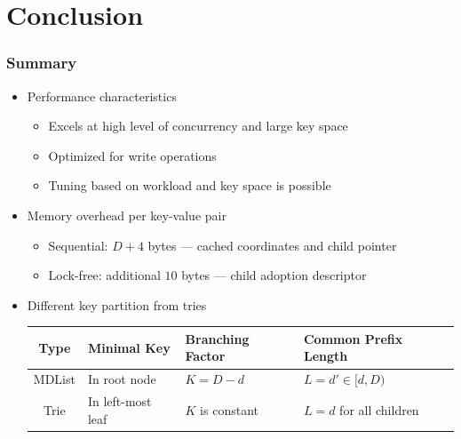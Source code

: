 \documentclass{beamer}
\begin{document}
\section{Conclusion}
\begin{frame} \frametitle{Summary}
    \begin{itemize}
        \item Performance characteristics
            \begin{itemize}
                \item Excels at high level of concurrency and large key space
                \item Optimized for write operations
                \item Tuning based on workload and key space is possible
            \end{itemize}
        \item<2,3> Memory overhead per key-value pair
            \begin{itemize}
                \item Sequential: $D + 4$ bytes --- cached coordinates and child pointer
                \item Lock-free: additional $10$ bytes --- child adoption descriptor 
            \end{itemize}
        \item<3> Different key partition from tries
            \begin{center}
            \footnotesize
            \begin{tabular}{ | c | l | l | p{5cm} |}
            \hline
            Type & Minimal Key & Branching Factor & Common Prefix Length\\ \hline
            MDList & In root node & $K=D-d$ & $L = d' \in [d,D)$ \\ \hline
            Trie & In left-most leaf & $K$ is constant & $L = d$ for all children\\
            \hline
            \end{tabular}
            \end{center}
        \end{itemize}
\end{frame}
\end{document}
